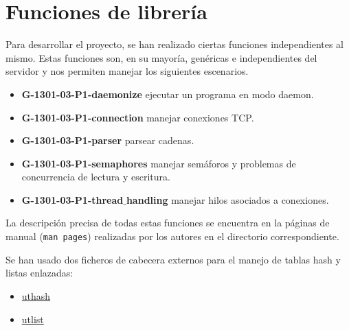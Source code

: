 \documentclass{mathnotes}
\begin{document}
\section{Funciones de librería}
Para desarrollar el proyecto, se han realizado ciertas funciones independientes al mismo. Estas funciones son, en su mayoría, genéricas e independientes del servidor y nos permiten manejar los siguientes escenarios.

\begin{itemize}
\item \textbf{G-1301-03-P1-daemonize} ejecutar un programa en modo daemon.

\item \textbf{G-1301-03-P1-connection} manejar conexiones TCP.

\item \textbf{G-1301-03-P1-parser} parsear cadenas.

\item \textbf{G-1301-03-P1-semaphores} manejar semáforos y problemas de concurrencia de lectura y escritura.

\item \textbf{G-1301-03-P1-thread$\_$handling} manejar hilos asociados a conexiones.
\end{itemize}

La descripción precisa de todas estas funciones se encuentra en la páginas de manual (\texttt{man pages}) realizadas por los autores en el directorio correspondiente.

Se han usado dos ficheros de cabecera externos para el manejo de tablas hash y listas enlazadas:
\begin{itemize}
\item \href{http://troydhanson.github.io/uthash/userguide.html}{uthash}
\item
\href{http://troydhanson.github.io/uthash/utlist.html}{utlist}
\end{itemize}
\end{document}
